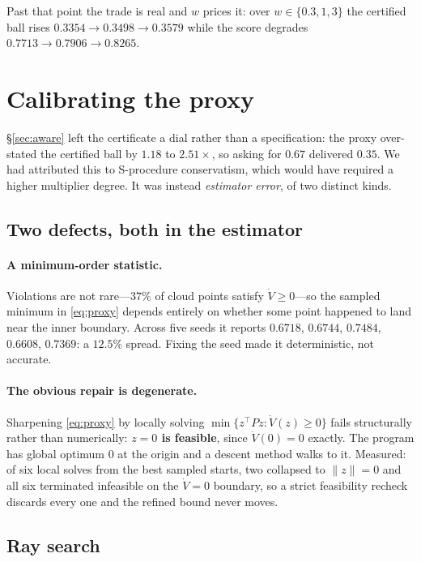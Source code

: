 \documentclass[11pt]{article}
\theoremstyle{plain}
\theoremstyle{definition}
\newcommand{\Vdot}{\dot{V}}
\begin{document}
Past that point the trade is real and $w$ prices it: over $w\in\{0.3,1,3\}$ the
certified ball rises $0.3354\to0.3498\to0.3579$ while the score degrades
$0.7713\to0.7906\to0.8265$.

\section{Calibrating the proxy}
\label{sec:calibrate}

\S\ref{sec:aware} left the certificate a dial rather than a specification: the
proxy over-stated the certified ball by $1.18$ to $2.51\times$, so asking for
$0.67$ delivered $0.35$. We had attributed this to S-procedure conservatism,
which would have required a higher multiplier degree. It was instead
\emph{estimator error}, of two distinct kinds.

\subsection{Two defects, both in the estimator}

\paragraph{A minimum-order statistic.} Violations are not rare---$37\%$ of
cloud points satisfy $\Vdot\ge0$---so the sampled minimum in \eqref{eq:proxy}
depends entirely on whether some point happened to land near the inner
boundary. Across five seeds it reports $0.6718$, $0.6744$, $0.7484$, $0.6608$,
$0.7369$: a $12.5\%$ spread. Fixing the seed made it deterministic, not
accurate.

\paragraph{The obvious repair is degenerate.} Sharpening \eqref{eq:proxy} by
locally solving $\min\{z^{\top}Pz:\Vdot(z)\ge0\}$ fails structurally rather than
numerically: \textbf{$z=0$ is feasible}, since $\Vdot(0)=0$ exactly. The program
has global optimum $0$ at the origin and a descent method walks to it. Measured:
of six local solves from the best sampled starts, two collapsed to $\|z\|=0$ and
all six terminated infeasible on the $\Vdot=0$ boundary, so a strict feasibility
recheck discards every one and the refined bound never moves.

\subsection{Ray search}
\end{document}
